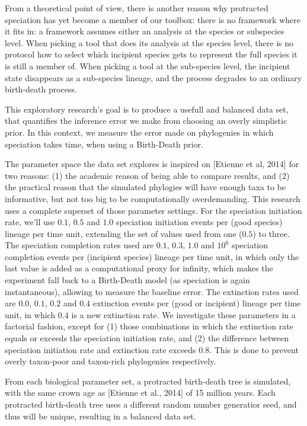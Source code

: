 \documentclass{article}
\begin{document}
From a theoretical point of view, there is another reason why protracted
speciation has yet become a member of our toolbox: there is no framework
where it fits in: a framework assumes either an analysis at the species or
subspecies level. When picking a tool that does its analysis at the
species level, there is no protocol how to select which incipient species
gets to represent the full species it is still a member of. When picking
a tool at the sub-species level, the incipient state disappears as a
sub-species lineage, and the process degrades to an ordinary birth-death 
process.

This exploratory research's goal is to produce a 
usefull and balanced data set, that quantifies the inference error 
we make from choosing an overly simplistic prior. In this context, 
we measure the error made on phylogenies in which speciation takes 
time, when using a Birth-Death prior.

The parameter space the data set explores is inspired on 
[Etienne et al, 2014] for two reasons: (1) the academic
reason of being able to compare results, and (2) the practical
reason that the simulated phylogies will have enough taxa to
be informative, but not too big to be computationally overdemanding.
This research uses a complete superset of those parameter settings.
For the speciation initiation rate, we'll use $0.1$, $0.5$ and $1.0$ 
speciation initiation events per (good species) lineage per time unit, 
extending the set of
values used from one ($0.5$) to three. 
The speciation completion
rates used are $0.1$, $0.3$, $1.0$ and $10^6$ speciation completion
events per (incipient species) lineage per time unit, in which only
the last value is added as a computational proxy for infinity, which
makes the experiment fall back to a Birth-Death model (as speciation
is again instantaneous), allowing to measure the baseline error.
The extinction rates used are $0.0$, $0.1$, $0.2$ and $0.4$ 
extinction events per (good or incipient) lineage per time unit,
in which $0.4$ is a new extinction rate.
We investigate these parameters in a factorial fashion, except for
(1) those combinations in which the extinction rate equals or exceeds
the speciation initiation rate, and (2) the difference between
speciation initiation rate and extinction rate exceeds 0.8. This is
done to prevent overly taxon-poor and taxon-rich phylogenies respectively.

From each biological parameter set, a protracted birth-death tree is simulated,
with the same crown age as [Etienne et al., 2014] of 15 million years. 
Each protracted birth-death tree uses a different random number
generatior seed, and thus will be unique, resulting in a balanced 
data set. 
\end{document}
